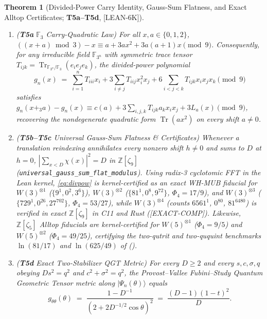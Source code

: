 \documentclass[11pt,reqno]{amsart}
\newtheorem{theorem}{Theorem}[section]
\theoremstyle{definition}
\newcommand{\F}{\mathbb{F}}
\newcommand{\Z}{\mathbb{Z}}
\newcommand{\Tr}{\operatorname{Tr}}
\newcommand{\taglean}{\textsf{[LEAN-6K]}}
\newcommand{\tagcomp}{\textsf{[EXACT-COMP]}}
\begin{document}
\begin{theorem}[Divided-Power Carry Identity, Gauss-Sum Flatness, and Exact Alltop Certificates; \textbf{T5a--T5d}, \taglean]\label{thm:p5}
\leavevmode
\begin{enumerate}[leftmargin=1.8em]
  \item \emph{(\textbf{T5a} $\F_3$ Carry-Quadratic Law)} For all $x,a\in\{0,1,2\}$,
  $((x+a)\bmod 3)-x\equiv a+3ax^2+3a(a+1)x\pmod 9$. Consequently, for any irreducible
  field $\F_{3^n}$ with symmetric trace tensor $T_{ijk}=\Tr_{\F_{3^n}/\F_3}(e_ie_je_k)$,
  the divided-power polynomial
  \begin{equation}\label{eq:divpow}
    g_n(x) \;=\; \sum_{i=1}^n T_{iii}x_i + 3\sum_{i\neq j}T_{iij}x_i^2 x_j
      + 6\sum_{i<j<k}T_{ijk}x_i x_j x_k \pmod 9
  \end{equation}
  satisfies $g_n(x+_3 a)-g_n(x)\equiv c(a)+3\sum_{i,j,k}T_{ijk}a_k x_i x_j+3L_a(x)\pmod 9$,
  recovering the nondegenerate quadratic form $\Tr(ax^2)$ on every shift $a\neq 0$.
  \item \emph{(\textbf{T5b--T5c} Universal Gauss-Sum Flatness \& Certificates)}
  Whenever a translation reindexing annihilates every nonzero shift $h\neq 0$
  and sums to $D$ at $h=0$, $|\sum_{x<D}\chi(x)|^2=D$ in $\Z[\zeta_9]$
  (\texttt{universal\_\allowbreak gauss\_\allowbreak sum\_\allowbreak flat\_\allowbreak modulus}). Using radix-3 cyclotomic FFT in the
  Lean kernel, \eqref{eq:divpow} is kernel-certified as an exact WH-MUB fiducial for
  $W(3)^{\otimes 1}$ ($\{9^1, 0^2, 3^6\}$), $W(3)^{\otimes 2}$ ($\{81^1, 0^8, 9^{72}\}$,
  $\Phi_4=17/9$), and $W(3)^{\otimes 3}$ ($\{729^1, 0^{26}, 27^{702}\}$, $\Phi_4=53/27$),
  while $W(3)^{\otimes 4}$ (counts $6561^1$, $0^{80}$, $81^{6480}$) is verified in exact
  $\Z[\zeta_9]$ in C11 and Rust (\tagcomp). Likewise, $\Z[\zeta_5]$ Alltop fiducials are
  kernel-certified for $W(5)^{\otimes 1}$ ($\Phi_4=9/5$) and $W(5)^{\otimes 2}$
  ($\Phi_4=49/25$), certifying the two-qutrit and two-ququint benchmarks $\ln(81/17)$
  and $\ln(625/49)$ of \cite{Knipfer2026TwoQutrit} ().
  \item \emph{(\textbf{T5d} Exact Two-Stabilizer QGT Metric)} For every $D\ge 2$ and every
  $s,c,\sigma,q$ obeying $Ds^2=q^2$ and $c^2+\sigma^2=q^2$, the Provost--Vallee
  \cite{Provost1980Riemannian} Fubini--Study Quantum Geometric Tensor metric along
  $|\Psi_n(\theta)\rangle$ equals
  \begin{equation}\label{eq:qgt}
    g_{\theta\theta}(\theta)
    \;=\; \frac{1 - D^{-1}}{(2 + 2 D^{-1/2}\cos\theta)^2}
    \;=\; \frac{(D-1)(1-t)^2}{D}.
  \end{equation}
\end{enumerate}
\end{theorem}
\end{document}
